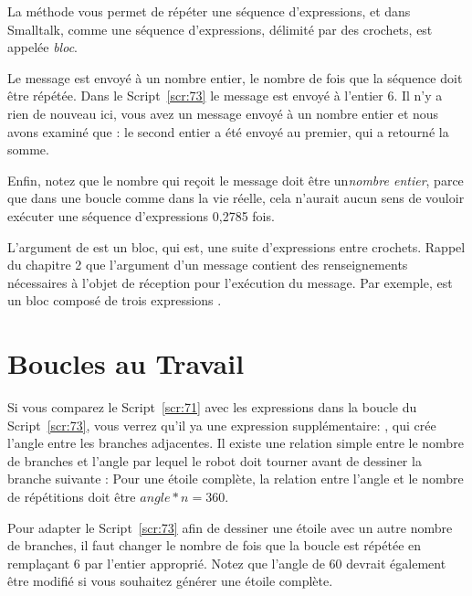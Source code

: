 \documentclass[a4paper,10pt,twoside]{book}
\begin{document}

La méthode  vous permet de répéter une séquence d'expressions, et dans Smalltalk, 
comme une séquence d'expressions, délimité par des crochets, est appelée  \emph{bloc}. 

Le message est envoyé à un nombre entier, le nombre de fois que la séquence doit 
être répétée. Dans le Script~\ref{scr:73} le message  est envoyé à 
l'entier 6. Il n'y a rien de nouveau ici, vous avez un message envoyé à un nombre entier 
et nous avons examiné que : le second entier a été envoyé au premier, qui a retourné la somme. 

Enfin, notez que le nombre qui reçoit le message doit être un\emph{nombre entier}, 
parce que dans une boucle comme dans la vie réelle, cela n'aurait aucun sens 
de vouloir exécuter une séquence d'expressions 0,2785 fois. 

L'argument de  est un bloc, qui est, une suite d'expressions entre crochets. 
Rappel du chapitre 2 que l'argument d'un message contient des renseignements nécessaires à 
l'objet de réception pour l'exécution du message. Par exemple,  
est un bloc composé de trois expressions . 



\section{Boucles au Travail} 

Si vous comparez le Script~\ref{scr:71} avec les expressions dans la boucle du  Script~\ref{scr:73}, 
vous verrez qu'il ya une expression supplémentaire: , qui crée l'angle 
entre les branches adjacentes. Il existe une relation simple entre le nombre de branches et 
l'angle par lequel le robot doit tourner avant de dessiner la branche suivante : Pour une 
étoile complète, la relation entre l'angle et le nombre de répétitions doit être 
$angle*n = 360$. 

Pour adapter le Script~\ref{scr:73} afin de dessiner une étoile avec un autre nombre de branches, 
il faut changer le nombre de fois que la boucle est répétée en remplaçant $6$ par l'entier approprié. 
Notez que l'angle de $60$ devrait également être modifié si vous souhaitez générer une étoile complète. 
\end{document}
